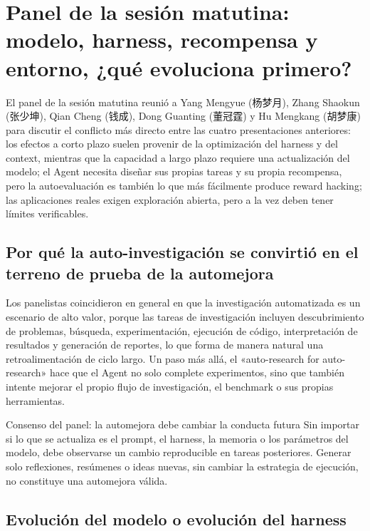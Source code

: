 \section{Panel de la sesión matutina: modelo, harness, recompensa y entorno, ¿qué evoluciona primero?}

El panel de la sesión matutina reunió a Yang Mengyue (杨梦月), Zhang Shaokun (张少坤), Qian Cheng (钱成), Dong Guanting (董冠霆) y Hu Mengkang (胡梦康) para discutir el conflicto más directo entre las cuatro presentaciones anteriores: los efectos a corto plazo suelen provenir de la optimización del harness y del context, mientras que la capacidad a largo plazo requiere una actualización del modelo; el Agent necesita diseñar sus propias tareas y su propia recompensa, pero la autoevaluación es también lo que más fácilmente produce reward hacking; las aplicaciones reales exigen exploración abierta, pero a la vez deben tener límites verificables.

\subsection{Por qué la auto-investigación se convirtió en el terreno de prueba de la automejora}

Los panelistas coincidieron en general en que la investigación automatizada es un escenario de alto valor, porque las tareas de investigación incluyen descubrimiento de problemas, búsqueda, experimentación, ejecución de código, interpretación de resultados y generación de reportes, lo que forma de manera natural una retroalimentación de ciclo largo. Un paso más allá, el «auto-research for auto-research» hace que el Agent no solo complete experimentos, sino que también intente mejorar el propio flujo de investigación, el benchmark o sus propias herramientas.

\begin{importantbox}{Consenso del panel: la automejora debe cambiar la conducta futura}
Sin importar si lo que se actualiza es el prompt, el harness, la memoria o los parámetros del modelo, debe observarse un cambio reproducible en tareas posteriores. Generar solo reflexiones, resúmenes o ideas nuevas, sin cambiar la estrategia de ejecución, no constituye una automejora válida.
\end{importantbox}

\subsection{Evolución del modelo o evolución del harness}

